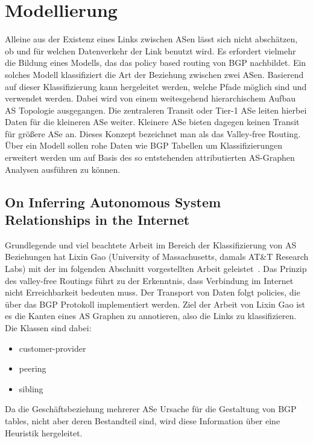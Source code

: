 \section{Modellierung}\label{sec:modellierung}

Alleine aus der Existenz eines Links zwischen ASen lässt sich nicht abschätzen, ob und für welchen Datenverkehr der Link benutzt wird.
Es erfordert vielmehr die Bildung eines Modells, das das policy based routing von BGP nachbildet.
Ein solches Modell klassifiziert die Art der Beziehung zwischen zwei ASen.
Basierend auf dieser Klassifizierung kann hergeleitet werden, welche Pfade möglich sind und verwendet werden.
Dabei wird von einem weitesgehend hierarchischem Aufbau AS Topologie ausgegangen.
Die zentraleren Transit oder Tier-1 ASe leiten hierbei Daten für die kleineren ASe weiter.
Kleinere ASe bieten dagegen keinen Transit für größere ASe an.
Dieses Konzept bezeichnet man als das Valley-free Routing.
Über ein Modell sollen rohe Daten wie BGP Tabellen um Klassifizierungen erweitert werden um auf Basis des so entstehenden attributierten AS-Graphen Analysen ausführen zu können.

\subsection{On Inferring Autonomous System Relationships in the Internet}
Grundlegende und viel beachtete Arbeit im Bereich der Klassifizierung von AS Beziehungen hat Lixin Gao (University of Massachusetts, damals AT\&T Research Labs) mit der im folgenden Abschnitt vorgestellten Arbeit geleistet~\cite{Gao:2001:IAS:504611.504616}.
Das Prinzip des valley-free Routings führt zu der Erkenntnis, dass Verbindung im Internet nicht Erreichbarkeit bedeuten muss.
Der Transport von Daten folgt policies, die über das BGP Protokoll implementiert werden.
Ziel der Arbeit von Lixin Gao ist es die Kanten eines AS Graphen zu annotieren, also die Links zu klassifizieren.
Die Klassen sind dabei:
\begin{itemize}
  \item customer-provider
  \item peering
  \item sibling
\end{itemize}
Da die Geschäftsbeziehung mehrerer ASe Ursache für die Gestaltung von BGP tables, nicht aber deren Bestandteil sind, wird diese Information über eine Heuristik hergeleitet.

